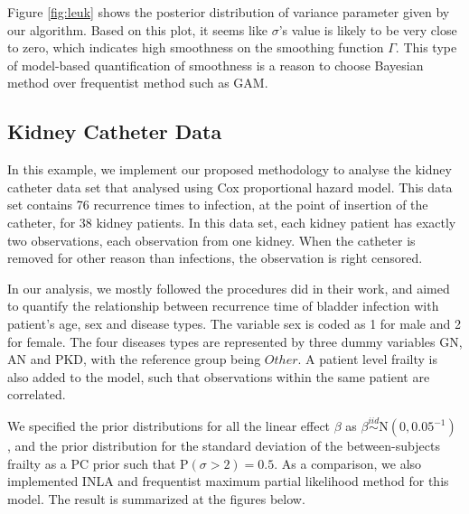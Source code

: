 \documentclass[]{article}
\begin{document}
Figure \ref{fig:leuk} shows the posterior distribution of variance parameter given by our algorithm. Based on this plot, it seems like $\sigma$'s value is likely to be very close to zero, which indicates high smoothness on the smoothing function $\Gamma$. This type of model-based quantification of smoothness is a reason to choose Bayesian method over frequentist method such as GAM.


\subsection{Kidney Catheter Data}

In this example, we implement our proposed methodology to analyse the kidney catheter data set that \citet{kidney} analysed using Cox proportional hazard model. This data set contains 76 recurrence times to infection, at the point of insertion of the catheter, for 38 kidney patients. In this data set, each kidney patient has exactly two observations, each observation from one kidney. When the catheter is removed for other reason than infections, the observation is right censored.

In our analysis, we mostly followed the procedures \citet{kidney} did in their work, and aimed to quantify the relationship between recurrence time of bladder infection with patient's age, sex and  disease types. The variable sex is coded as 1 for male and 2 for female. The four diseases types are represented by three dummy variables $\text{GN}$, $\text{AN}$ and $\text{PKD}$, with the reference group being $Other$. A patient level frailty is also added to the model, such that observations within the same patient are correlated. 

We specified the prior distributions for all the linear effect $\beta$ as $\beta \stackrel{iid}{\sim} \text{N}(0, 0.05^{-1})$ , and the prior distribution for the standard deviation of the between-subjects frailty as a PC prior such that $\text{P}(\sigma > 2) = 0.5$. As a comparison, we also implemented INLA and frequentist maximum partial likelihood method for this model. The result is summarized at the figures below.
\end{document}
